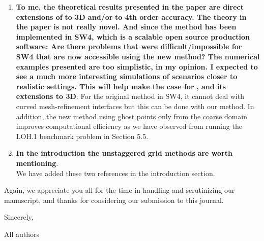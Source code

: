 \documentclass[twoside,11pt]{article}
\begin{document}
\begin{enumerate}
\item  \textbf{To me, the theoretical results presented in the paper are direct extensions of} \cite{wang2019fourth} \textbf{to 3D and/or} \cite{petersson2009stable} \textbf{to 4th order accuracy. The theory in the paper is not really novel. And since the method has been implemented in SW4, which is a scalable open source production software: Are there problems that were difficult/impossible for SW4 that are now accessible using the new method? The numerical examples presented are too simplistic, in my opinion. I expected to see a much more interesting simulations of scenarios closer to realistic settings. This will help make the case for} \cite{wang2019fourth}\textbf{, and its extensions to 3D}: For the original method in SW4, it cannot deal with curved mesh-refinement interfaces but this can be done with our method. In addition, the new method using ghost points only from the coarse domain improves computational efficiency as we have observed from running the LOH.1 benchmark problem in Section 5.5.

\item \textbf{In the introduction the unstaggered grid methods} \cite{kozdon2013simulation,duru2016dynamic} \textbf{are worth mentioning}.\\
We have added these two references in the introduction section.

\end{enumerate}

Again, we appreciate you all for the time in handling and scrutinizing our manuscript, and thanks for considering our submission to this journal.

Sincerely, 

All authors



\end{document}
